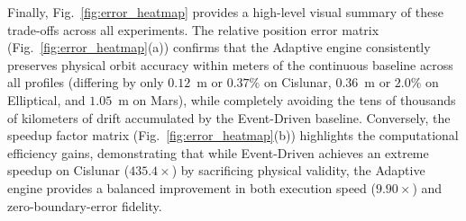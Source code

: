 \documentclass[a4paper,fleqn]{cas-sc}
\begin{document}
Finally, Fig.~\ref{fig:error_heatmap} provides a high-level visual summary of these trade-offs across all experiments. The relative position error matrix (Fig.~\ref{fig:error_heatmap}(a)) confirms that the Adaptive engine consistently preserves physical orbit accuracy within meters of the continuous baseline across all profiles (differing by only $0.12$~m or $0.37\%$ on Cislunar, $0.36$~m or $2.0\%$ on Elliptical, and $1.05$~m on Mars), while completely avoiding the tens of thousands of kilometers of drift accumulated by the Event-Driven baseline. Conversely, the speedup factor matrix (Fig.~\ref{fig:error_heatmap}(b)) highlights the computational efficiency gains, demonstrating that while Event-Driven achieves an extreme speedup on Cislunar ($435.4\times$) by sacrificing physical validity, the Adaptive engine provides a balanced improvement in both execution speed ($9.90\times$) and zero-boundary-error fidelity.
\end{document}
